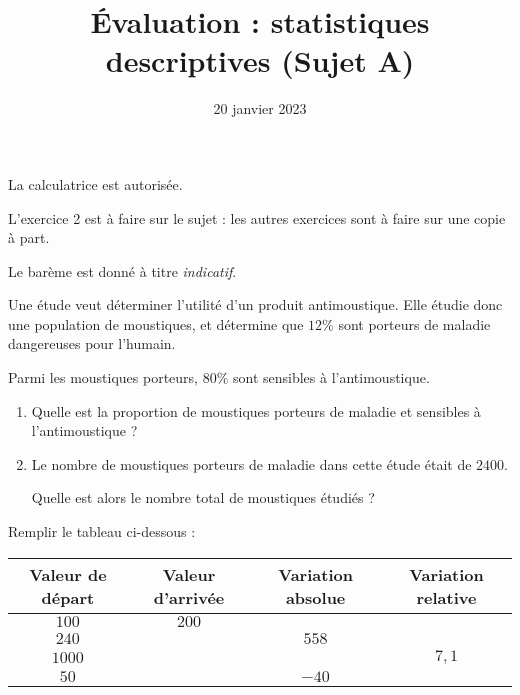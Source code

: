 \documentclass[
	classe=$2^{de}$,
	headerTitle=Évaluation\space Chapitre\space 4
]{évaluation}
\title{Évaluation : statistiques descriptives (Sujet A)}
\date{20 janvier 2023}
\begin{document}
\maketitle

\begin{tcolorbox}
	La calculatrice est autorisée.

	L'exercice 2 est à faire sur le sujet : les autres exercices sont à faire sur une copie à part.

	Le barème est donné à titre \textit{indicatif}.
\end{tcolorbox}

\begin{exercice}[2]

	Une étude veut déterminer l'utilité d'un produit antimoustique. Elle étudie donc une population de moustiques, et détermine que $12\%$ sont porteurs de maladie dangereuses pour l'humain.

	Parmi les moustiques porteurs, $80\%$ sont sensibles à l'antimoustique.

	\begin{enumerate}
		\item Quelle est la proportion de moustiques porteurs de maladie et sensibles à l'antimoustique ? 
		\item Le nombre de moustiques porteurs de maladie dans cette étude était de $2400$.

		      Quelle est alors le nombre total de moustiques étudiés ? 
	\end{enumerate}
\end{exercice}

\begin{exercice}[4]
	Remplir le tableau ci-dessous :

	\begin{center}
		\begin{tabular}{|c|c|c|c|}
			\hline
			Valeur de départ & Valeur d'arrivée    & Variation absolue   & Variation relative   \\ \hline
			$100$            & $200$               & \correction{$100$}  & \correction{1}       \\ \hline
			$240$            & \correction{$798$}  & $558$               & \correction{$2,325$} \\ \hline
			$1000$           & \correction{$8100$} & \correction{$7100$} & $7,1$                \\ \hline
			$50$             & \correction{$10$}   & $-40$               & \correction{$-0,8$}  \\ \hline
		\end{tabular}
	\end{center}
\end{exercice}
\end{document}
